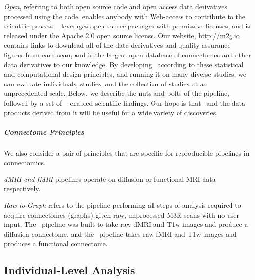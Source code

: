\documentclass[11pt]{article}
\begin{document}
\begin{multicols}{2}
\emph{Open}, referring to both open source code and open access data derivatives processed using the code, enables anybody with Web-access to contribute to the scientific process. 
 \ndmg~leverages open source packages with permissive licenses, and is released under the Apache 2.0 open source license.  
Our website, \url{http://m2g.io} contains links to download all of the data derivatives and quality assurance figures from each scan, and is the largest open database of connectomes and other data derivatives to our knowledge.
By developing \ndmg~according to these  statistical and computational design principles, and running it on many diverse studies, we can evaluate individuals, studies, and the collection of studies at an unprecedented scale. Below, we describe the nuts and bolts of the pipeline, followed by a set of \ndmg~-enabled scientific findings. Our hope is that \ndmg~and the data products derived from it will be useful for a wide variety of discoveries.

\subparagraph*{Connectome Principles} We also consider a pair of principles that are specific for reproducible pipelines in connectomics.  



\emph{dMRI and fMRI} pipelines operate on diffusion  or functional MRI data respectively.

\emph{Raw-to-Graph} refers to the pipeline performing all steps of analysis required to acquire connectomes (graphs) given raw, unprocessed M3R scans with no user input. The \ndmgd~pipeline was built to take raw dMRI and T1w images and produce a diffusion connectome, and the \ndmgf~pipeline takes raw fMRI and T1w images and produces a functional connectome.

\subsection{Individual-Level Analysis}



%


\end{multicols}
\end{document}
